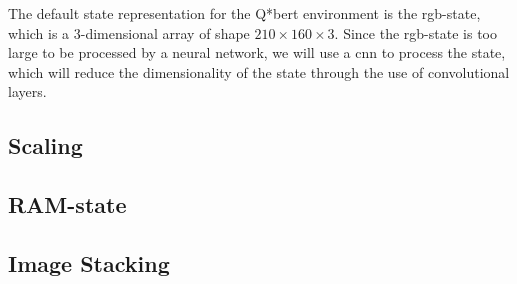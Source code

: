 The default state representation for the Q*bert environment is the
\gls{rgb}-state, which is a 3-dimensional array of shape $210 \times 160 \times
3$. Since the \gls{rgb}-state is too large to be processed by a neural network,
we will use a \gls{cnn} to process the state, which will reduce the
dimensionality of the state through the use of convolutional layers.

\subsection{Scaling}\label{sec:environment-state-representation-scaling}


\subsection{RAM-state}\label{sec:environment-state-representation-ram-state}


\subsection{Image Stacking}\label{sec:environment-state-representation-image-stacking}
